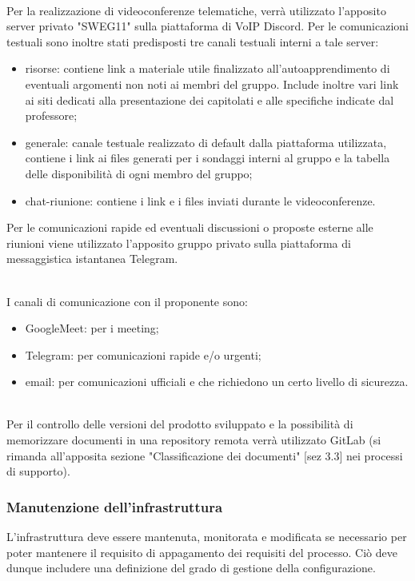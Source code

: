 \leavevmode \\

 Per la realizzazione di videoconferenze telematiche, verrà utilizzato l'apposito server privato "SWEG11" sulla piattaforma di VoIP Discord.
Per le comunicazioni testuali sono inoltre stati predisposti tre canali testuali interni a tale server:

\begin{itemize}
    \item risorse: contiene link a materiale utile finalizzato all'autoapprendimento di eventuali argomenti non noti ai membri del gruppo. Include inoltre vari link ai siti dedicati alla presentazione dei capitolati e  alle specifiche indicate dal professore;
    \item generale: canale testuale realizzato di default dalla piattaforma utilizzata, contiene i link ai files generati per i sondaggi interni al gruppo e la tabella delle disponibilità di ogni membro del gruppo;
    \item chat-riunione: contiene i link e i files inviati durante le videoconferenze.
\end{itemize}

Per le comunicazioni rapide ed eventuali discussioni o proposte esterne alle riunioni viene utilizzato l'apposito gruppo privato sulla piattaforma di messaggistica istantanea Telegram.

\leavevmode \\

I canali di comunicazione con il proponente sono:
\begin{itemize}
    \item GoogleMeet: per i meeting; 
    \item Telegram: per comunicazioni rapide e/o urgenti;
    \item email: per comunicazioni ufficiali e che richiedono un certo livello di sicurezza.
\end{itemize}
\leavevmode \\
Per il controllo delle versioni del prodotto sviluppato e la possibilità di memorizzare documenti in una repository remota verrà utilizzato GitLab (si rimanda all'apposita sezione "Classificazione dei documenti" [sez 3.3] nei processi di supporto).

\subsubsection{Manutenzione dell'infrastruttura}
L'infrastruttura deve essere mantenuta, monitorata e modificata se necessario per poter mantenere il requisito di appagamento dei requisiti del processo. Ciò deve dunque includere una definizione del grado di gestione della configurazione.
